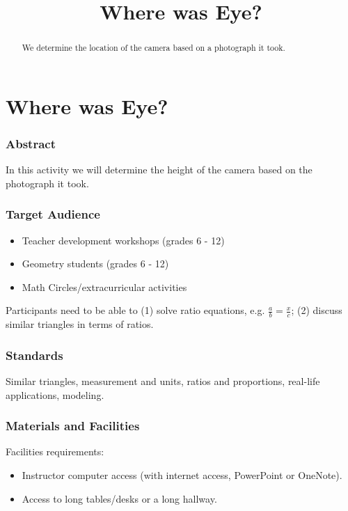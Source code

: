 \documentclass{ximera}
\title{Where was Eye?} \license{CC BY-NC-SA 4.0}
\begin{document}
\begin{abstract}
We determine the location of the camera based on a photograph it took.
\end{abstract}
\maketitle

\section*{Where was Eye?}

\subsubsection*{Abstract}
In this activity we will determine the height of the camera based on the photograph it took. 

\subsubsection*{Target Audience}
\begin{itemize}
    \item Teacher development workshops (grades 6 - 12)
    \item Geometry students (grades 6 - 12)
    \item Math Circles/extracurricular activities
\end{itemize}

Participants need to be able to (1) solve ratio equations, e.g. $\frac{a}{b}=\frac{x}{c}$; (2) discuss similar triangles in terms of ratios.

\subsubsection*{Standards}
Similar triangles, measurement and units, ratios and proportions, real-life applications, modeling. 

\subsubsection*{Materials and Facilities}
Facilities requirements:
\begin{itemize}
    \item Instructor computer access (with internet access, PowerPoint or OneNote).
    \item Access to long tables/desks or a long hallway.
\end{itemize}
\end{document}
